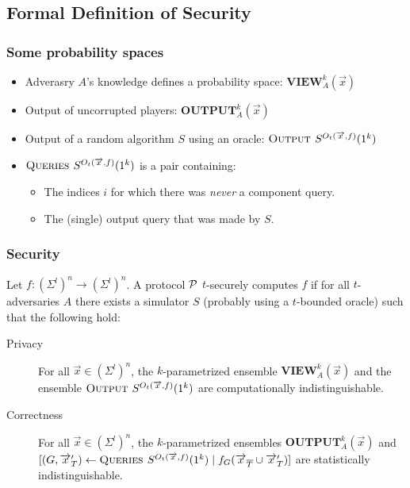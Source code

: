 \documentclass{beamer}
\begin{document}
\subsection{Formal Definition of Security}

\begin{frame}
  \frametitle{Some probability spaces}
  \begin{itemize}
  \item Adverasry $A$'s knowledge defines a probability space: $\mathbf{VIEW}_A^k(\overrightarrow{x})$
  \item Output of uncorrupted players: $\mathbf{OUTPUT}_A^k(\overrightarrow{x})$
  \item Output of a random algorithm $S$ using an oracle: $\textsc{Output } S^{O_t(\overrightarrow{x},f)}(1^k)$
  \item $\textsc{Queries } S^{O_t(\overrightarrow{x},f)}(1^k)$ is a pair containing:

    \begin{itemize}
    \item The indices $i$ for which there was \emph{never} a component query.
    \item The (single) output query that was made by $S$.
    \end{itemize}

  \end{itemize}
\end{frame}

\begin{frame}
  \frametitle{Security}  
  \begin{definition}
    Let $f:(\Sigma^l)^n\rightarrow(\Sigma^l)^n$. A protocol ${\cal P}$ $t$-securely computes $f$ if for all $t$-adversaries $A$ there exists a simulator $S$ (probably using a $t$-bounded oracle) such that the following hold:
    \begin{description}
    \item[Privacy] For all $\overrightarrow{x}\in(\Sigma^l)^n$, the $k$-parametrized ensemble $\mathbf{VIEW}_A^k(\overrightarrow{x})$ and the ensemble $\textsc{Output } S^{O_t(\overrightarrow{x},f)}(1^k)$ are computationally indistinguishable.
    \item[Correctness] For all $\overrightarrow{x}\in(\Sigma^l)^n$, the $k$-parametrized ensembles $\mathbf{OUTPUT}_A^k(\overrightarrow{x})$ and $[(G,\overrightarrow{x}'_T) \leftarrow \textsc{Queries } S^{O_t(\overrightarrow{x},f)}(1^k)\mid f_G(\overrightarrow{x}_{\overline{T}}\cup\overrightarrow{x}'_T)]$ are statistically indistinguishable.
    \end{description}
  \end{definition}

\end{frame}
\end{document}
